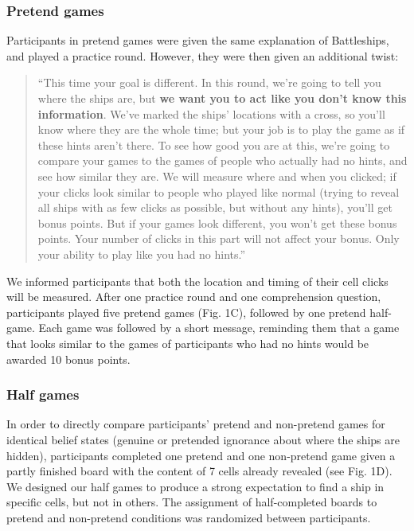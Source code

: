 \documentclass[10pt, letterpaper]{article}
\begin{document}
\hypertarget{pretend-games}{%
\subsubsection{Pretend games}\label{pretend-games}}

Participants in pretend games were given the same explanation of
Battleships, and played a practice round. However, they were then given
an additional twist:

\begin{quote}
``This time your goal is different. In this round, we're going to tell
you where the ships are, but \textbf{we want you to act like you don't
know this information}. We've marked the ships' locations with a cross,
so you'll know where they are the whole time; but your job is to play
the game as if these hints aren't there. To see how good you are at
this, we're going to compare your games to the games of people who
actually had no hints, and see how similar they are. We will measure
where and when you clicked; if your clicks look similar to people who
played like normal (trying to reveal all ships with as few clicks as
possible, but without any hints), you'll get bonus points. But if your
games look different, you won't get these bonus points. Your number of
clicks in this part will not affect your bonus. Only your ability to
play like you had no hints.''
\end{quote}

We informed participants that both the location and timing of their cell
clicks will be measured. After one practice round and one comprehension
question, participants played five pretend games (Fig. 1C), followed by
one pretend half-game. Each game was followed by a short message,
reminding them that a game that looks similar to the games of
participants who had no hints would be awarded 10 bonus points.

\hypertarget{half-games}{%
\subsubsection{Half games}\label{half-games}}

In order to directly compare participants' pretend and non-pretend games
for identical belief states (genuine or pretended ignorance about where
the ships are hidden), participants completed one pretend and one
non-pretend game given a partly finished board with the content of 7
cells already revealed (see Fig. 1D). We designed our half games to
produce a strong expectation to find a ship in specific cells, but not
in others. The assignment of half-completed boards to pretend and
non-pretend conditions was randomized between participants.
\end{document}
